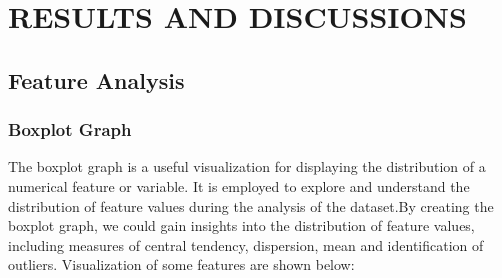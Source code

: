 \chapter{RESULTS AND DISCUSSIONS}
\thispagestyle{empty}
\onehalfspacing
\pagestyle{fancy}
\fancyhf{}
\fancyhead[LE,RO]{\textit{\footnotesize \thepage}}
 
\renewcommand{\headrulewidth}{2pt}
\renewcommand{\footrulewidth}{1pt}


\section{Feature Analysis}
\subsection*{Boxplot Graph}
\par The boxplot graph is a useful visualization for displaying the distribution of a numerical feature or variable. It is employed to explore and understand the distribution of feature values during the analysis of the dataset.By creating the boxplot graph, we could gain insights into the distribution of feature values, including measures of central tendency, dispersion, mean and identification of outliers. Visualization of some features are shown below:

\begin{figure}[H]
  \centering
  \hfill
  \label{fig:bothfigures}
\end{figure}

